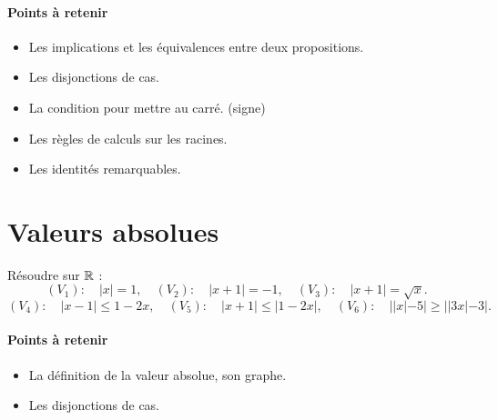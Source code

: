 \documentclass[a4paper, 11pt]{article}
\begin{document}
\paragraph{Points à retenir}
\begin{itemize}
    \item Les implications et les équivalences entre deux propositions.
    \item Les disjonctions de cas. 
    \item La condition pour mettre au carré. (signe)
    \item Les règles de calculs sur les racines.
    \item Les identités remarquables. 
\end{itemize}

\section{Valeurs absolues}
\begin{exercice}
    Résoudre  sur $\mathbb{R}$ : 
         $$(V_1):  \quad |x| = 1,  \quad (V_2) : \quad |x+1| = -1, \quad(V_3) : \quad |x+1| =\sqrt{x}.$$
     $$(V_4):  \quad |x-1| \leq 1-2x,  \quad (V_5) : \quad |x+1| \leq |1-2x|, \quad(V_6) : \quad || x|-5| \geqslant|| 3 x|-3| .$$
\end{exercice}

\paragraph{Points à retenir}
\begin{itemize}
    \item La définition de la valeur absolue, son graphe.
    \item Les disjonctions de cas. 
\end{itemize}
\end{document}
